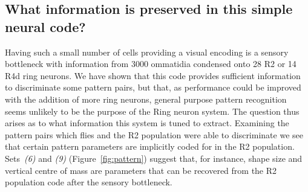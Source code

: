 \documentclass[10pt]{article}
\begin{document}
\subsection*{What information is preserved in this simple neural code?}
Having such a small number of cells providing a visual encoding is a sensory bottleneck with information from 3000 ommatidia condensed onto 28 R2 or 14 R4d ring neurons. We have shown that this code provides sufficient information to discriminate some pattern pairs, but that, as performance could be improved with the addition of more ring neurons, general purpose pattern recognition seems unlikely to be the purpose of the Ring neuron system. The question thus arises as to what information this system is tuned to extract. Examining the pattern pairs which flies and the R2 population were able to discriminate we see that certain pattern parameters are implicitly coded for in the R2 population. Sets~\emph{(6)} and \emph{(9)} (Figure~\ref{fig:pattern}) suggest that, for instance, shape size and vertical centre of mass are parameters that can be recovered from the R2 population code after the sensory bottleneck.
\end{document}
